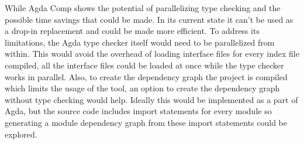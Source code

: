 While Agda Comp shows the potential of parallelizing type checking and the
possible time savings that could be made. In its current state it can't be used
as a drop-in replacement and could be made more efficient. To address its
limitations, the Agda type checker itself would need to be parallelized from
within. This would avoid the overhead of loading interface files for every
index file compiled, all the interface files could be loaded at once while the
type checker works in parallel. Also, to create the dependency graph the
project is compiled which limits the usage of the tool, an option to create the
dependency graph without type checking would help. Ideally this would be
implemented as a part of Agda, but the source code includes import statements
for every module so generating a module dependency graph from these
import statements could be explored.

%
